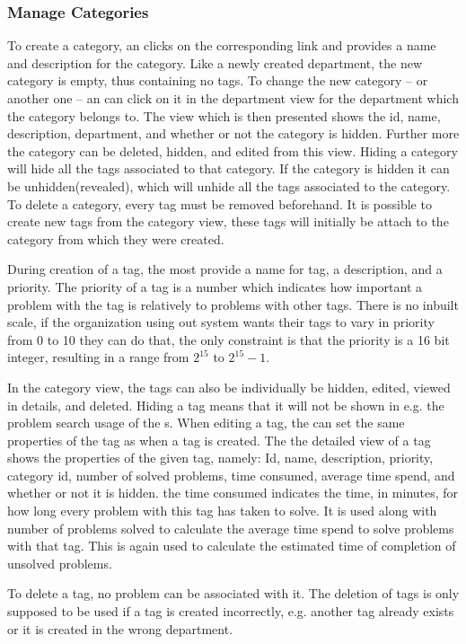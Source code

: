 \subsubsection{Manage Categories}
To create a category, an \admin[] clicks on the corresponding link and provides a name and description for the category.
Like a newly created department, the new category is empty, thus containing no tags.
To change the new category -- or another one -- an \admin[] can click on it in the department view for the department which the category belongs to.
The view which is then presented shows the id, name, description, department, and whether or not the category is hidden.
Further more the category can be deleted, hidden, and edited from this view.
Hiding a category will hide all the tags associated to that category.
If the category is hidden it can be unhidden(revealed), which will unhide all the tags associated to the category.
To delete a category, every tag must be removed beforehand.
It is possible to create new tags from the category view, these tags will initially be attach to the category from which they were created.

During creation of a tag, the \admin[] most provide a name for tag, a description, and a priority.
The priority of a tag is a number which indicates how important a problem with the tag is relatively to problems with other tags.
There is no inbuilt scale, if the organization using out system wants their tags to vary in priority from 0 to 10 they can do that, the only constraint is that the priority is a 16 bit integer, resulting in a range from $2^{15}$ to $2^{15}-1$.

In the category view, the tags can also be individually be hidden, edited, viewed in details, and deleted.
Hiding a tag means that it will not be shown in e.g. the problem search usage of the \aclient[]s.
When editing a tag, the \admin[]can set the same properties of the tag as when a tag is created.
The the detailed view of a tag shows the properties of the given tag, namely: Id, name, description, priority, category id, number of solved problems, time consumed, average time spend, and whether or not it is hidden.
the time consumed indicates the time, in minutes, for how long every problem with this tag has taken to solve.
It is used along with number of problems solved to calculate the average time spend to solve problems with that tag.
This is again used to calculate the estimated time of completion of unsolved problems.

To delete a tag, no problem can be associated with it.
The deletion of tags is only supposed to be used if a tag is created incorrectly, e.g. another tag already exists or it is created in the wrong department.

